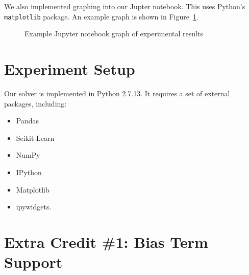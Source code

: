 \documentclass{report}
\begin{document}
  We also implemented graphing into our Jupter notebook.  This uses Python's \texttt{matplotlib} package.  An example graph is shown in Figure~\ref{fig:jupyterGraph}.
  
  \begin{figure}[tb]
    \centering
    \caption{Example Jupyter notebook graph of experimental results}\label{fig:jupyterGraph}
  \end{figure}

  
  \section{Experiment Setup}
  
  Our solver is implemented in Python 2.7.13.  It requires a set of external packages, including: 
  
  \begin{multicols}{2}
    \begin{itemize}
      \setlength\itemsep{0pt}
      \item Pandas
      \item Scikit-Learn
      \item NumPy
      \item IPython
      \item Matplotlib
      \item ipywidgets\textrm{.}
    \end{itemize}
  \end{multicols}

  \section{Extra Credit \#1: Bias Term Support}
  
\end{document}
